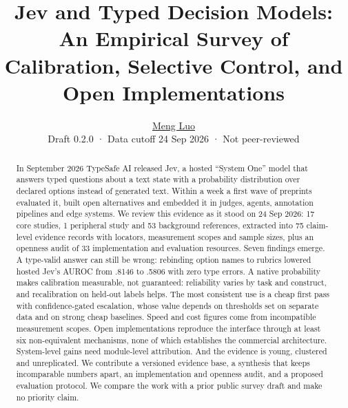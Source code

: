 \documentclass[10.5pt,a4paper]{article}
\title{\vspace{-1.2em}Jev and Typed Decision Models: An Empirical Survey of Calibration, Selective Control, and Open Implementations}
\author{\large \href{https://eurekaleo.github.io/}{Meng Luo}\\[5pt]\normalsize Draft 0.2.0 · Data cutoff 24 Sep 2026 · Not peer-reviewed}
\date{}
\begin{document}
\maketitle
\begin{abstract}\noindent
In September 2026 TypeSafe AI released Jev, a hosted “System One” model that answers typed questions about a text state with a probability distribution over declared options instead of generated text. Within a week a first wave of preprints evaluated it, built open alternatives and embedded it in judges, agents, annotation pipelines and edge systems. We review this evidence as it stood on 24 Sep 2026: 17 core studies, 1 peripheral study and 53 background references, extracted into 75 claim-level evidence records with locators, measurement scopes and sample sizes, plus an openness audit of 33 implementation and evaluation resources. Seven findings emerge. A type-valid answer can still be wrong: rebinding option names to rubrics lowered hosted Jev's AUROC from .8146 to .5806 with zero type errors. A native probability makes calibration measurable, not guaranteed: reliability varies by task and construct, and recalibration on held-out labels helps. The most consistent use is a cheap first pass with confidence-gated escalation, whose value depends on thresholds set on separate data and on strong cheap baselines. Speed and cost figures come from incompatible measurement scopes. Open implementations reproduce the interface through at least six non-equivalent mechanisms, none of which establishes the commercial architecture. System-level gains need module-level attribution. And the evidence is young, clustered and unreplicated. We contribute a versioned evidence base, a synthesis that keeps incomparable numbers apart, an implementation and openness audit, and a proposed evaluation protocol. We compare the work with a prior public survey draft and make no priority claim.
\end{abstract}


















\appendix


\end{document}
